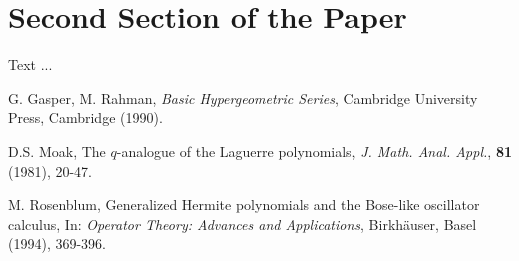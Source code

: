 \documentclass[12pt]{article}
\theoremstyle{theorem}
\theoremstyle{defi}
\begin{document}
\section{Second Section of the Paper}

Text ...

\begin{thebibliography}{99}

 G. Gasper, M. Rahman,
{\it Basic Hypergeometric Series}, Cambridge University Press, Cambridge (1990).

 D.S. Moak,
The $q$-analogue of the Laguerre polynomials, {\it J. Math. Anal. Appl.}, {\bf 81} (1981), 20-47.

 M. Rosenblum,
Generalized Hermite polynomials and the Bose-like oscillator
calculus, In: {\it Operator Theory: Advances and Applications},
Birkh\"auser, Basel (1994), 369-396.

\end{thebibliography}
\end{document}
